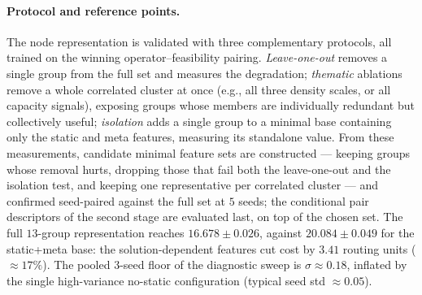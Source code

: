 \documentclass[letterpaper]{article} %
\begin{document}
\paragraph{Protocol and reference points.}
The node representation is validated with three complementary protocols, all trained on the winning operator--feasibility pairing. \emph{Leave-one-out} removes a single group from the full set and measures the degradation; \emph{thematic} ablations remove a whole correlated cluster at once (e.g., all three density scales, or all capacity signals), exposing groups whose members are individually redundant but collectively useful; \emph{isolation} adds a single group to a minimal base containing only the static and meta features, measuring its standalone value. From these measurements, candidate minimal feature sets are constructed --- keeping groups whose removal hurts, dropping those that fail both the leave-one-out and the isolation test, and keeping one representative per correlated cluster --- and confirmed seed-paired against the full set at $5$ seeds; the conditional pair descriptors of the second stage are evaluated last, on top of the chosen set. The full $13$-group representation reaches $16.678 \pm 0.026$, against $20.084 \pm 0.049$ for the static+meta base: the solution-dependent features cut cost by $3.41$ routing units ($\approx 17\%$). The pooled $3$-seed floor of the diagnostic sweep is $\sigma \approx 0.18$, inflated by the single high-variance no-static configuration (typical seed std $\approx 0.05$).
\end{document}
